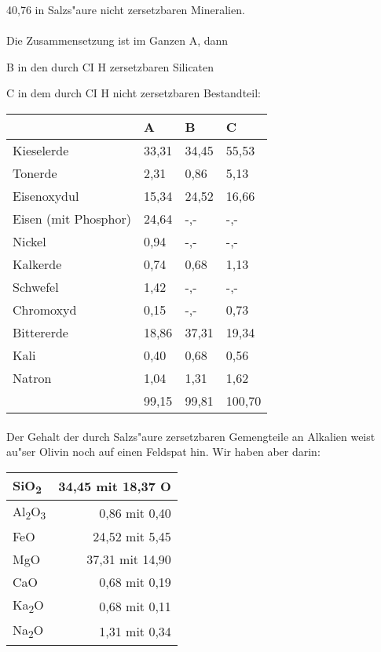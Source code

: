 \documentclass[a4paper, 11pt, oneside]{article}
\begin{document}
40,76 in Salzs"aure nicht zersetzbaren Mineralien.
\paragraph{}
Die Zusammensetzung ist im Ganzen A, dann

B in den durch CI H zersetzbaren Silicaten

C in dem durch CI H nicht zersetzbaren Bestandteil:
\begin{center}
\begin{tabular}{ |p{35mm}|p{15mm}|p{15mm}|p{15mm}| }
    \hline
    & A & B & C\\
    \hline\hline
    Kieselerde & 33,31 & 34,45 & 55,53\\\hline
    Tonerde & 2,31 & 0,86 & 5,13\\\hline
    Eisenoxydul & 15,34 & 24,52 & 16,66\\\hline
    Eisen (mit Phosphor) & 24,64 & -,- & -,-\\\hline
    Nickel & 0,94 & -,- & -,-\\\hline
    Kalkerde & 0,74 & 0,68 & 1,13\\\hline
    Schwefel & 1,42 & -,- & -,-\\\hline
    Chromoxyd & 0,15 & -,- & 0,73\\\hline
    Bittererde & 18,86 & 37,31 & 19,34\\\hline
    Kali & 0,40 & 0,68 & 0,56\\\hline
    Natron & 1,04 & 1,31 & 1,62\\\hline
    & 99,15 & 99,81 & 100,70\\
    \hline
\end{tabular}
\end{center}
\paragraph{}
Der Gehalt der durch Salzs"aure zersetzbaren Gemengteile an Alkalien weist au"ser Olivin noch auf einen Feldspat hin. Wir haben aber darin:
\begin{center}
    \begin{tabular}{ |l|r| } 
    \hline
    SiO\textsubscript{2} & 34,45 mit 18,37 O\\\hline
    Al\textsubscript{2}O\textsubscript{3} & 0,86 mit 0,40\\\hline
    FeO & 24,52 mit 5,45\\\hline
    MgO & 37,31 mit 14,90\\\hline
    CaO & 0,68 mit 0,19\\\hline
    Ka\textsubscript{2}O & 0,68 mit 0,11\\\hline
    Na\textsubscript{2}O & 1,31 mit 0,34\\
    \hline
    \end{tabular}
\end{center}
\end{document}
